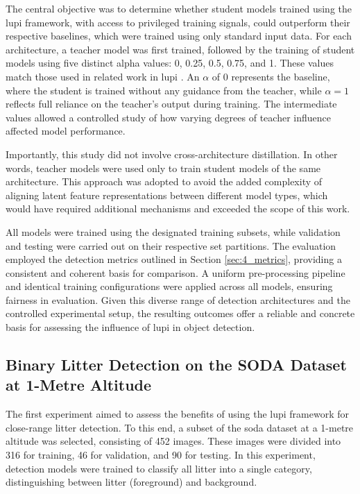 The central objective was to determine whether student models trained using the \gls{lupi} framework, with access to privileged training signals, could outperform their respective baselines, which were trained using only standard input data. For each architecture, a teacher model was first trained, followed by the training of student models using five distinct \gls{alpha} values: 0, 0.25, 0.5, 0.75, and 1. These values match those used in related work in \gls{lupi} \cite{lab2wild}. An $\alpha$ of 0 represents the baseline, where the student is trained without any guidance from the teacher, while $\alpha = 1$ reflects full reliance on the teacher’s output during training. The intermediate values allowed a controlled study of how varying degrees of teacher influence affected model performance.


Importantly, this study did not involve cross-architecture distillation. In other words, teacher models were used only to train student models of the same architecture. This approach was adopted to avoid the added complexity of aligning latent feature representations between different model types, which would have required additional mechanisms and exceeded the scope of this work.

All models were trained using the designated training subsets, while validation and testing were carried out on their respective set partitions. The evaluation employed the detection metrics outlined in Section \ref{sec:4_metrics}, providing a consistent and coherent basis for comparison. A uniform pre-processing pipeline and identical training configurations were applied across all models, ensuring fairness in evaluation. Given this diverse range of detection architectures and the controlled experimental setup, the resulting outcomes offer a reliable and concrete basis for assessing the influence of \gls{lupi} in object detection.


\subsection{Binary Litter Detection on the SODA Dataset at 1-Metre Altitude}
\label{subsec:5_soda01m_dataset_exp}

The first experiment aimed to assess the benefits of using the \gls{lupi} framework for close-range litter detection. To this end, a subset of the \gls{soda} dataset at a 1-metre altitude was selected, consisting of 452 images. These images were divided into 316 for training, 46 for validation, and 90 for testing. In this experiment, detection models were trained to classify all litter into a single category, distinguishing between litter (foreground) and background.

